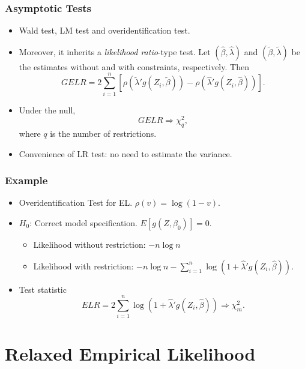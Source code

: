 \documentclass{beamer}
\begin{document}
\begin{frame}
\frametitle{Asymptotic Tests}
\begin{itemize}
\item 
Wald test, LM test and overidentification test. \pause
\item 
Moreover, it inherits a \emph{likelihood ratio}-type test. Let \((\widehat{\beta},
\widehat{\lambda}) \) 
and \(( \tilde{\beta}, \tilde{\lambda}) \) be the estimates without and with constraints, respectively. Then 
\[
GELR = 2 \sum_{i=1}^n \left[ 
\rho \left( \tilde{\lambda}'g(Z_i, \tilde{\beta})\right) - 
\rho \left( \widehat{\lambda}'g(Z_i, \widehat{\beta})\right)
\right].
\]
\item Under the null, \[GELR\Rightarrow \chi_q^2,\] where \(q\) is the number
of restrictions.
\item Convenience of LR test: no need to estimate the variance.
\end{itemize}


\end{frame}



\begin{frame}
\frametitle{Example}
\begin{itemize}
\item Overidentification Test for EL. \(\rho(v) = \log(1-v)\).
\item $H_0$: Correct model specification. \(E[g(Z,\beta_0)] = 0\). 
\begin{itemize}
\item Likelihood without restriction: \(-n\log n\)
\item Likelihood with restriction: \(-n\log n -\sum_{i=1}^n \log\left(1+\widehat{\lambda}'
g\left(Z_i,\widehat{\beta}\right)\right) \). \pause
\end{itemize}
\item Test statistic
\[
ELR = 2 \sum_{i=1}^n \log
\left(
1+\widehat{\lambda}'
g \left(Z_i,\widehat{\beta}\right)
\right) 
\Rightarrow
\chi_m^2.
\]
\end{itemize}
 \end{frame}






\section[REL]{Relaxed Empirical Likelihood}
\frame{\sectionpage}
\end{document}
